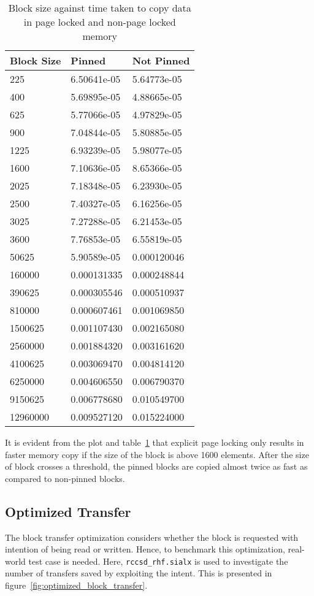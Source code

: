 \begin{table}[h]
  \centering
  \caption{Block size against time taken to copy data in page locked and non-page locked memory}
  \begin{tabular}{l l l}
    \hline
    Block Size & Pinned      & Not Pinned  \\
    \hline
    225        & 6.50641e-05 & 5.64773e-05 \\
    400        & 5.69895e-05 & 4.88665e-05 \\
    625        & 5.77066e-05 & 4.97829e-05 \\
    900        & 7.04844e-05 & 5.80885e-05 \\
    1225       & 6.93239e-05 & 5.98077e-05 \\
    1600       & 7.10636e-05 & 8.65366e-05 \\
    2025       & 7.18348e-05 & 6.23930e-05 \\
    2500       & 7.40327e-05 & 6.16256e-05 \\
    3025       & 7.27288e-05 & 6.21453e-05 \\
    3600       & 7.76853e-05 & 6.55819e-05 \\
    50625      & 5.90589e-05 & 0.000120046 \\
    160000     & 0.000131335 & 0.000248844 \\
    390625     & 0.000305546 & 0.000510937 \\
    810000     & 0.000607461 & 0.001069850 \\
    1500625    & 0.001107430 & 0.002165080 \\
    2560000    & 0.001884320 & 0.003161620 \\
    4100625    & 0.003069470 & 0.004814120 \\
    6250000    & 0.004606550 & 0.006790370 \\
    9150625    & 0.006778680 & 0.010549700 \\
    12960000   & 0.009527120 & 0.015224000 \\
    \hline
  \end{tabular}
  \label{tab:mempin_block_copy}
\end{table}

It is evident from the plot and table~\ref{tab:mempin_block_copy} that explicit
page locking only results in faster memory copy if the size of the block is above
1600 elements. After the size of block crosses a threshold, the pinned blocks are
copied almost twice as fast as compared to non-pinned blocks.

\subsection{Optimized Transfer}
The block transfer optimization considers whether the block is requested with
intention of being read or written. Hence, to benchmark this optimization, real-world
test case is needed. Here, \texttt{rccsd\_rhf.sialx} is used to investigate the
number of transfers saved by exploiting the intent. This is presented in
figure~\ref{fig:optimized_block_transfer}.

